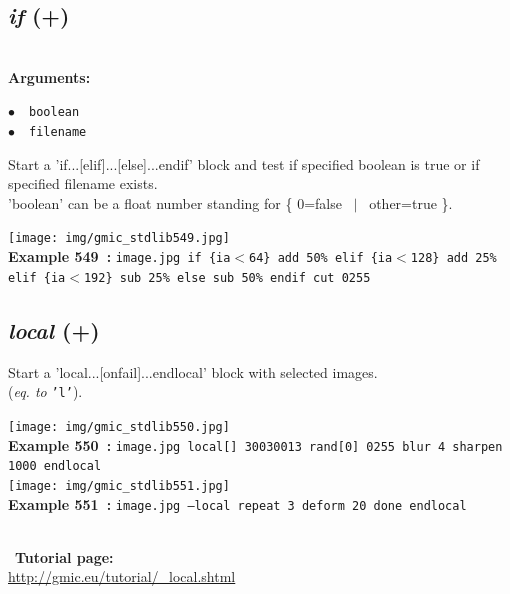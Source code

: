 \documentclass[a4paper,10.5pt,twoside]{book}
\def\comma{\discretionary{,}{}{,}}
\newcommand{\Cb}[1]{\textcolor{cb}{#1}}
\begin{document}
\subsection{\emph{if} (+)}\vspace*{-0.7em}
~\\\textbf{\Cb{Arguments: }}\begin{flushleft}
{\small \Cb{\hspace*{0.5cm}$\bullet$~~\texttt{boolean}}}~~~\\
{\small \Cb{\hspace*{0.5cm}$\bullet$~~\texttt{filename}}}\end{flushleft}
Start a 'if...[elif]...[else]...endif' block and test if specified boolean is true{\comma}
or if specified filename exists.
~\\'boolean' can be a float number standing for \{ 0=false ~$|$~ other=true \}.
\begin{center}\texttt{[image: img/gmic\_stdlib549.jpg]}\\
{\footnotesize \textbf{Example 549~:} \texttt{image.jpg if \{ia$<$64\} add 50\% elif \{ia$<$128\} add 25\% elif \{ia$<$192\} sub 25\% else sub 50\% endif cut 0{\comma}255}}
\end{center}

\subsection{\emph{local} (+)}\vspace*{-0.7em}
Start a 'local...[onfail]...endlocal' block{\comma} with selected images.
~\\(\emph{eq. to} {\small \texttt{'l'}}).
\begin{center}\texttt{[image: img/gmic\_stdlib550.jpg]}\\
{\footnotesize \textbf{Example 550~:} \texttt{image.jpg local[] 300{\comma}300{\comma}1{\comma}3 rand[0] 0{\comma}255 blur 4 sharpen 1000 endlocal}}
\\\texttt{[image: img/gmic\_stdlib551.jpg]}\\
{\footnotesize \textbf{Example 551~:} \texttt{image.jpg --local repeat 3 deform 20 done endlocal}}
\end{center}
~\\
~\textbf{Tutorial page: }\\\url{http://gmic.eu/tutorial/\_local.shtml}
\end{document}
